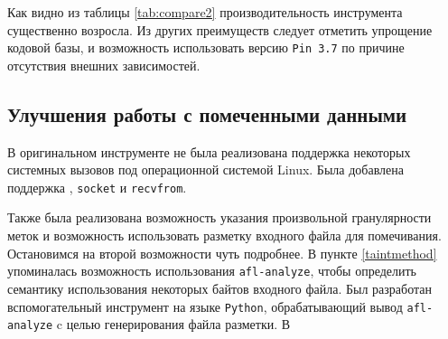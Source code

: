 Как видно из таблицы \ref{tab:compare2} производительность инструмента существенно возросла. Из других преимуществ следует отметить упрощение кодовой базы, и возможность использовать версию \texttt{Pin 3.7} по причине отсутствия внешних зависимостей.

\subsection{Улучшения работы с помеченными данными}

В оригинальном инструменте не была реализована поддержка некоторых системных вызовов под операционной системой Linux. Была добавлена поддержка , \texttt{socket} и \texttt{recvfrom}.

Также была реализована возможность указания произвольной гранулярности меток и возможность использовать разметку входного файла для помечивания. Остановимся на второй возможности чуть подробнее. 
В пункте \ref{taintmethod} упоминалась возможность использования \texttt{afl-analyze}, чтобы определить семантику использования некоторых байтов входного файла. Был разработан вспомогательный инструмент на языке \texttt{Python}, обрабатывающий вывод \texttt{afl-analyze} c целью генерирования файла разметки. В \texttt{}